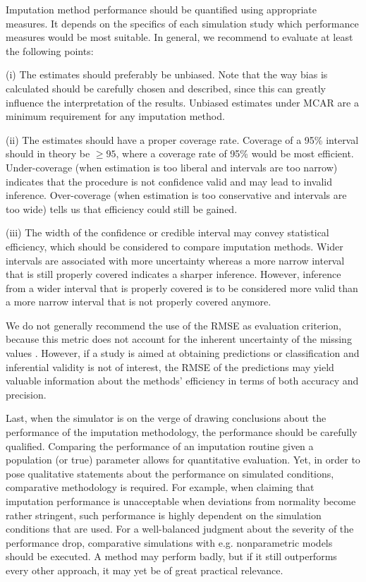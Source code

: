 \documentclass[bimj,fleqn]{w-art}
\begin{document}
Imputation method performance should be quantified using appropriate measures. It depends on the specifics of each simulation study which performance measures would be most suitable. In general, we recommend to evaluate at least the following points:

(i) The estimates should preferably be unbiased. Note that the way bias is calculated should be carefully chosen and described, since this can greatly influence the interpretation of the results. Unbiased estimates under MCAR are a minimum requirement for any imputation method.

(ii) The estimates should have a proper coverage rate. Coverage of a 95\% interval should in theory be $\geq 95$, where a coverage rate of 95\% would be most efficient. Under-coverage (when estimation is too liberal and intervals are too narrow) indicates that the procedure is not confidence valid and may lead to invalid inference. Over-coverage (when estimation is too conservative and intervals are too wide) tells us that efficiency could still be gained. 

(iii) The width of the confidence or credible interval may convey statistical efficiency, which should be considered to compare imputation methods. Wider intervals are associated with more uncertainty whereas a more narrow interval that is still properly covered indicates a sharper inference. However, inference from a wider interval that is properly covered is to be considered more valid than a more narrow interval that is not properly covered anymore. 

We do not generally recommend the use of the RMSE as evaluation criterion, because this metric does not account for the inherent uncertainty of the missing values \citep[][\S 2.5]{buur18}. However, if a study is aimed at obtaining predictions or classification and inferential validity is not of interest, the RMSE of the predictions may yield valuable information about the methods' efficiency in terms of both accuracy and precision.

Last, when the simulator is on the verge of drawing conclusions about the performance of the imputation methodology, the performance should be carefully qualified. Comparing the performance of an imputation routine given a population (or true) parameter allows for quantitative evaluation. Yet, in order to pose qualitative statements about the performance on simulated conditions, comparative methodology is required. For example, when claiming that imputation performance is unacceptable when deviations from normality become rather stringent, such performance is highly dependent on the simulation conditions that are used. For a well-balanced judgment about the severity of the performance drop, comparative simulations with e.g. nonparametric models should be executed. A method may perform badly, but if it still outperforms every other approach, it may yet be of great practical relevance.
\end{document}
